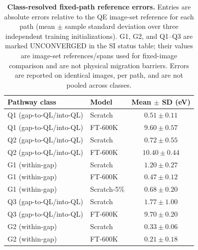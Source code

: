 \begin{table}[htbp]
\centering
\caption{\textbf{Class-resolved fixed-path reference errors.} Entries are absolute errors relative to the QE image-set reference for each path (mean $\pm$ sample standard deviation over three independent training initializations). G1, G2, and Q1--Q3 are marked UNCONVERGED in the SI status table; their values are image-set references/spans used for fixed-image comparison and are not physical migration barriers. Errors are reported on identical images, per path, and are not pooled across classes.}
\label{tab:a3_strict_path_errors}
\begin{tabular}{llc}
\toprule
Pathway class & Model & Mean $\pm$ SD (eV) \\
\midrule
Q1 (gap-to-QL/into-QL) & Scratch & $0.51 \pm 0.11$ \\
Q1 (gap-to-QL/into-QL) & FT-600K & $9.60 \pm 0.57$ \\
Q2 (gap-to-QL/into-QL) & Scratch & $0.72 \pm 0.55$ \\
Q2 (gap-to-QL/into-QL) & FT-600K & $10.40 \pm 0.44$ \\
G1 (within-gap) & Scratch & $1.20 \pm 0.27$ \\
G1 (within-gap) & FT-600K & $0.47 \pm 0.12$ \\
G1 (within-gap) & Scratch-5\% & $0.68 \pm 0.20$ \\
Q3 (gap-to-QL/into-QL) & Scratch & $1.77 \pm 1.00$ \\
Q3 (gap-to-QL/into-QL) & FT-600K & $9.70 \pm 0.20$ \\
G2 (within-gap) & Scratch & $0.33 \pm 0.06$ \\
G2 (within-gap) & FT-600K & $0.21 \pm 0.18$ \\
\bottomrule
\end{tabular}
\end{table}

